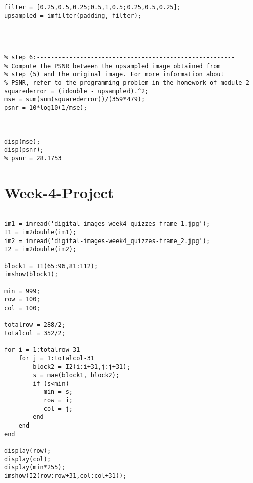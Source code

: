 \documentclass[12 pt]{article}
\begin{document}
\begin{lstlisting}
filter = [0.25,0.5,0.25;0.5,1,0.5;0.25,0.5,0.25];
upsampled = imfilter(padding, filter);




% step 6:-------------------------------------------------------
% Compute the PSNR between the upsampled image obtained from 
% step (5) and the original image. For more information about
% PSNR, refer to the programming problem in the homework of module 2
squarederror = (idouble - upsampled).^2;
mse = sum(sum(squarederror))/(359*479);
psnr = 10*log10(1/mse);



disp(mse);
disp(psnr);
% psnr = 28.1753

 \end{lstlisting}
 


 \newpage
 \section{Week-4-Project}
 
 \begin{lstlisting}
 
im1 = imread('digital-images-week4_quizzes-frame_1.jpg');
I1 = im2double(im1);
im2 = imread('digital-images-week4_quizzes-frame_2.jpg');
I2 = im2double(im2);

block1 = I1(65:96,81:112);
imshow(block1);

min = 999;
row = 100;
col = 100;

totalrow = 288/2;
totalcol = 352/2;

for i = 1:totalrow-31
    for j = 1:totalcol-31
        block2 = I2(i:i+31,j:j+31);
        s = mae(block1, block2);
        if (s<min)
           min = s;
           row = i;
           col = j;   
        end
    end
end

display(row);
display(col);
display(min*255);
imshow(I2(row:row+31,col:col+31));


 \end{lstlisting}
 



 \newpage
\end{document}

